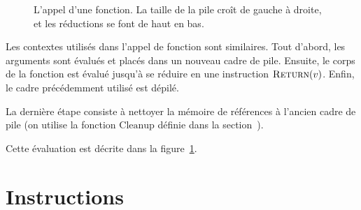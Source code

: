 \shorthandoff{!}
\begin{figure}

  \centering


  \caption{L'appel d'une fonction. La taille de la pile croît de gauche à
  droite, et les réductions se font de haut en bas.}
  \label{fig:fcall-details}

\end{figure}
\shorthandon{!}

Les contextes utilisés dans l'appel de fonction sont similaires. Tout d'abord,
les arguments sont évalués et placés dans un nouveau cadre de pile. Ensuite, le
corps de la fonction est évalué jusqu'à se réduire en une instruction
$\iReturn{v}$. Enfin, le cadre précédemment utilisé est dépilé.

La dernière étape consiste à nettoyer la mémoire de références à l'ancien cadre
de pile (on utilise la fonction $\mathrm{Cleanup}$ définie dans la
section~\label{sec:memops}).

\begin{mathpar}
\end{mathpar}

Cette évaluation est décrite dans la figure~\ref{fig:fcall-details}.

\section{Instructions}
\label{sec:eval-instr}

